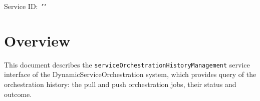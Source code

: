 \documentclass[a4paper]{arrowhead}
\begin{document}
\sloppy

\ArrowheadSetup

\begin{center}
  \vspace*{1cm}
  \huge{\arrowtitle}

  \vspace*{0.2cm}
  \LARGE{\arrowtype}
  \vspace*{1cm}

  \Large{Service ID: \textit{"\arrowid"}}

  \vspace*{\fill}


  \vspace*{1cm}
  \vspace*{\fill}

  \begin{abstract}
    This document describes the HTTP/1.1 protocol with TLS payload security and JSON payload encoding variant of the \texttt{service\allowbreak{}Orchestration\allowbreak{}History\allowbreak{}Management} service of the DynamicServiceOrchestration system.
  \end{abstract}

  \vspace*{1cm}
\end{center}

\newpage

\tableofcontents
\newpage

\section{Overview}
\label{sec:overview}

This document describes the \texttt{service\allowbreak{}Orchestration\allowbreak{}History\allowbreak{}Management} service interface of the DynamicServiceOrchestration system, which provides query of the orchestration history: the pull and push orchestration jobs, their status and outcome.
\end{document}
